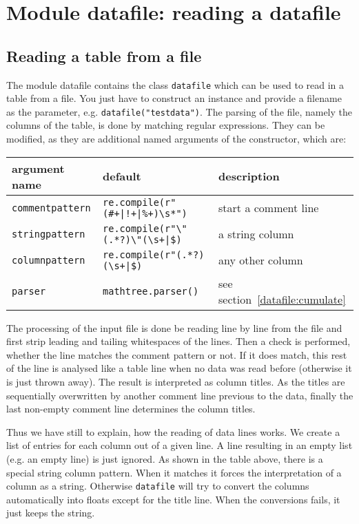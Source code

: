 \chapter{Module datafile: reading a datafile}
\label{datafile}

\section{Reading a table from a file}

The module datafile contains the class \verb|datafile| which can be
used to read in a table from a file. You just have to construct an
instance and provide a filename as the parameter, e.g.
\verb|datafile("testdata")|. The parsing of the file, namely the
columns of the table, is done by matching regular expressions. They
can be modified, as they are additional named arguments of the
constructor, which are:

\medskip
\begin{tabularx}{\linewidth}{ll>{\raggedright\arraybackslash}X}
argument name&default&description\\
\hline
\texttt{commentpattern}&\texttt{re.compile(r"(\#+|!+|\%+)\textbackslash s*")}&start a comment line\\
\texttt{stringpattern}&\texttt{re.compile(r"\textbackslash"(.*?)\textbackslash"(\textbackslash s+|\$)}&a string column\\
\texttt{columnpattern}&\texttt{re.compile(r"(.*?)(\textbackslash s+|\$)}&any other column\\
\texttt{parser}&\texttt{mathtree.parser()}&see section~\ref{datafile:cumulate}\\
\end{tabularx}
\medskip

The processing of the input file is done be reading line by line from
the file and first strip leading and tailing whitespaces of the lines.
Then a check is performed, whether the line matches the comment
pattern or not. If it does match, this rest of the line is analysed
like a table line when no data was read before (otherwise it is just
thrown away). The result is interpreted as column titles. As the
titles are sequentially overwritten by another comment line previous
to the data, finally the last non-empty comment line determines the
column titles.

Thus we have still to explain, how the reading of data lines works. We
create a list of entries for each column out of a given line. A line
resulting in an empty list (e.g. an empty line) is just ignored. As
shown in the table above, there is a special string column pattern.
When it matches it forces the interpretation of a column as a string.
Otherwise \verb|datafile| will try to convert the columns
automatically into floats except for the title line. When the
conversions fails, it just keeps the string.

